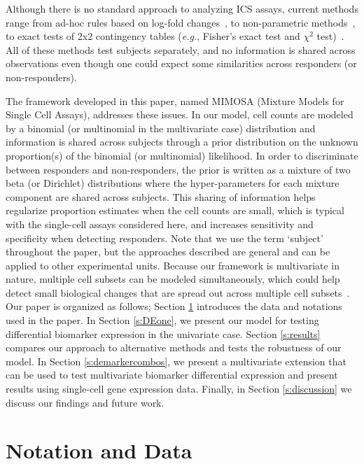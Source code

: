 \documentclass[12pt,oupdraft]{biostatistics}
\begin{document}
Although there is no standard approach to analyzing ICS assays, current methods range from ad-hoc rules based on log-fold changes~\citep{Trigona:2003}, to non-parametric methods~\citep{Sinclair:2004hs}, to exact tests of 2x2 contingency tables (\textit{e.g.}, Fisher's exact test and $\chi^2$ test)~\citep{Horton:2007tsa,Proschan:2009ks,Peiperl:2010ej,Nason:2006dx}.
All of these methods test subjects separately, and no information is shared across observations even though one could expect some similarities across responders (or non-responders).

The framework developed in this paper, named MIMOSA (Mixture Models for Single Cell Assays), addresses these issues. In our model, cell counts are modeled by a binomial (or multinomial in the multivariate case) distribution and information is shared across subjects through a prior distribution on the unknown proportion(s) of the binomial (or multinomial) likelihood.
In order to discriminate between responders and non-responders, the prior is written as a mixture of two beta (or Dirichlet) distributions where the hyper-parameters for each mixture component are shared across subjects.
This sharing of information helps regularize proportion estimates when the cell counts are small, which is typical with the single-cell assays considered here, and increases sensitivity and specificity when detecting responders. Note that we use the term `subject' throughout the paper, but the approaches described are general and can be applied to other experimental units.
Because our framework is multivariate in nature, multiple cell subsets can be modeled simultaneously, which could help detect small biological changes that are spread out across multiple cell subsets~\citep{Nason:2006dx}. Our paper is organized as follows; Section \ref{s:data} introduces the data and notations used in the paper. In Section \ref{s:DEone}, we present our model for testing differential biomarker expression in the univariate case. Section \ref{s:results} compares our approach to alternative methods and tests the robustness of our model. In Section \ref{s:demarkercombos}, we present a multivariate extension that can be used to test multivariate biomarker differential expression and present results using single-cell gene expression data. Finally, in Section \ref{s:discussion} we discuss our findings and future work.
\section{Notation and Data}
\label{s:data}
\end{document}
